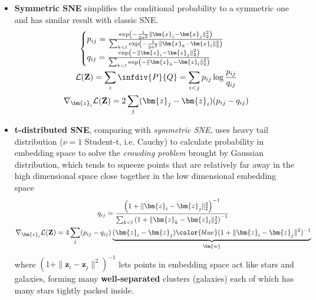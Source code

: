 \begin{itemize}
    \item \textbf{Symmetric SNE} simplifies the conditional probability to a symmetric one and has similar result with classic SNE.
    \begin{gather}
        \begin{cases}
            p_{ij} = \frac{\exp\left(-\frac{1}{2\sigma^2}\|\bm{x}_i-\bm{x}_j\|^2_2\right)}{\sum_{k<l}\exp\left(-\frac{1}{2\sigma^2}\|\bm{x}_k-\bm{x}_l\|^2_2\right)} \\
            q_{ij} = \frac{\exp\left(-\|\bm{z}_i-\bm{z}_j\|^2_2\right)}{\sum_{k<l}\exp\left(-\|\bm{z}_k-\bm{z}_l\|^2_2\right)}
        \end{cases}\\
        \mathcal{L}(\mathbf{Z}) = \sum_{i}\infdiv{P}{Q} = \sum_{i<j} p_{ij}\log\frac{p_{ij}}{q_{ij}} \\
        \nabla_{\bm{z}_i}\mathcal{L}(\mathbf{Z}) = 2\sum_{j}(\bm{z}_j-\bm{z}_i)(p_{ij}-q_{ij})
    \end{gather}

    \item \textbf{t-distributed SNE}, comparing with \textit{symmetric SNE}, 
    uses heavy tail distribution ($\nu=1$ Student-t, i.e. Cauchy) to calculate probability in embedding space
    to solve the \textit{crowding problem} brought by Gaussian distribution, 
    which tends to squeeze points that are relatively far away in the high dimensional space close together in the low dimensional embedding space
    \begin{gather}
        q_{ij}=\frac{\left(1+\|\bm{z}_i-\bm{z}_j\|_2^2\right)^{-1}}{\sum_{k<l}\left(1+\|\bm{z}_k-\bm{z}_l\|_2^2\right)^{-1}} \\
        \nabla_{\bm{z}_i}\mathcal{L}(\mathbf{Z}) = 4\sum_{j}(p_{ij}-q_{ij})\underbrace{(\bm{z}_i-\bm{z}_j){\color{blue}(1+\|\bm{z}_i-\bm{z}_j\|^2)^{-1}}}_{\bm{w}}
    \end{gather}
    where $(1+\|\bm{z}_i-\bm{z}_j\|^2)^{-1}$ lets points in embedding space act like stars and galaxies, 
    forming many \textbf{well-separated} clusters (galaxies) each of which has many stars tightly packed inside.
\end{itemize}

